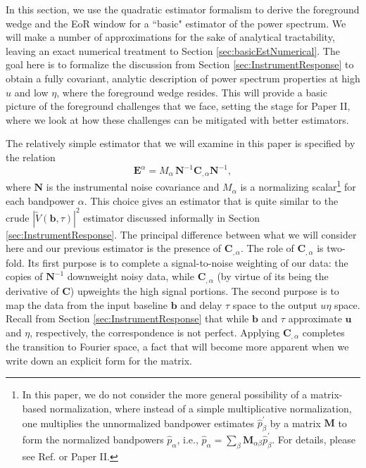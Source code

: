 \documentclass[twocolumn,aps,prd,nofootinbib,showpacs]{revtex4-1}
\begin{document}
In this section, we use the quadratic estimator formalism to derive the foreground wedge and the EoR window for a ``basic" estimator of the power spectrum.  We will make a number of approximations for the sake of analytical tractability, leaving an exact numerical treatment to Section \ref{sec:basicEstNumerical}.  The goal here is to formalize the discussion from Section \ref{sec:InstrumentResponse} to obtain a fully covariant, analytic description of power spectrum properties at high $u$ and low $\eta$, where the foreground wedge resides.  This will provide a basic picture of the foreground challenges that we face, setting the stage for Paper II, where we look at how these challenges can be mitigated with better estimators.

The relatively simple estimator that we will examine in this paper is specified by the relation
\begin{equation}
\label{eq:basicEstEalpha}
\mathbf{E}^\alpha = M_\alpha\, \mathbf{N}^{-1} \mathbf{C}_{,\alpha} \mathbf{N}^{-1},
\end{equation}
where $\mathbf{N}$ is the instrumental noise covariance and $M_\alpha$ is a normalizing scalar\footnote{In this paper, we do not consider the more general possibility of a matrix-based normalization, where instead of a simple multiplicative normalization, one multiplies the unnormalized bandpower estimates $\hat{p}_\beta^\prime$ by a matrix $\mathbf{M}$ to form the normalized bandpowers $\hat{p}_\alpha$, i.e., $\hat{p}_\alpha = \sum_\beta \mathbf{M}_{\alpha \beta} \hat{p}_\beta^\prime$.  For details, please see Ref. \cite{Dillon2014} or Paper II.} for each bandpower $\alpha$.  This choice gives an estimator that is quite similar to the crude $| \widetilde{V} (\mathbf{b}, \tau) |^2$ estimator discussed informally in Section \ref{sec:InstrumentResponse}.  The principal difference between what we will consider here and our previous estimator is the presence of $\mathbf{C}_{,\alpha}$.  The role of $\mathbf{C}_{,\alpha}$ is two-fold.  Its first purpose is to complete a signal-to-noise weighting of our data: the copies of $\mathbf{N}^{-1}$ downweight noisy data, while $\mathbf{C}_{,\alpha}$ (by virtue of its being the derivative of $\mathbf{C}$) upweights the high signal portions.  The second purpose is to map the data from the input baseline $\mathbf{b}$ and delay $\tau$ space to the output $u\eta$ space.  Recall from Section \ref{sec:InstrumentResponse} that while $\mathbf{b}$ and $\tau$ approximate $\mathbf{u}$ and $\eta$, respectively, the correspondence is not perfect.  Applying $\mathbf{C}_{,\alpha}$ completes the transition to Fourier space, a fact that will become more apparent when we write down an explicit form for the matrix.
\end{document}
